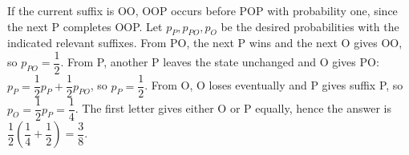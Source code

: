 If the current suffix is OO, OOP occurs before POP with probability one, since the next P completes OOP. Let $p_P,p_{PO},p_O$ be the desired probabilities with the indicated relevant suffixes. From PO, the next P wins and the next O gives OO, so $p_{PO}=\dfrac{1}{2}$. From P, another P leaves the state unchanged and O gives PO: $p_P=\dfrac{1}{2}p_P+\dfrac{1}{2}p_{PO}$, so $p_P=\dfrac{1}{2}$. From O, O loses eventually and P gives suffix P, so $p_O=\dfrac{1}{2}p_P=\dfrac{1}{4}$. The first letter gives either O or P equally, hence the answer is $\boxed{\dfrac{1}{2}(\dfrac{1}{4}+\dfrac{1}{2})=\dfrac{3}{8}}$.
